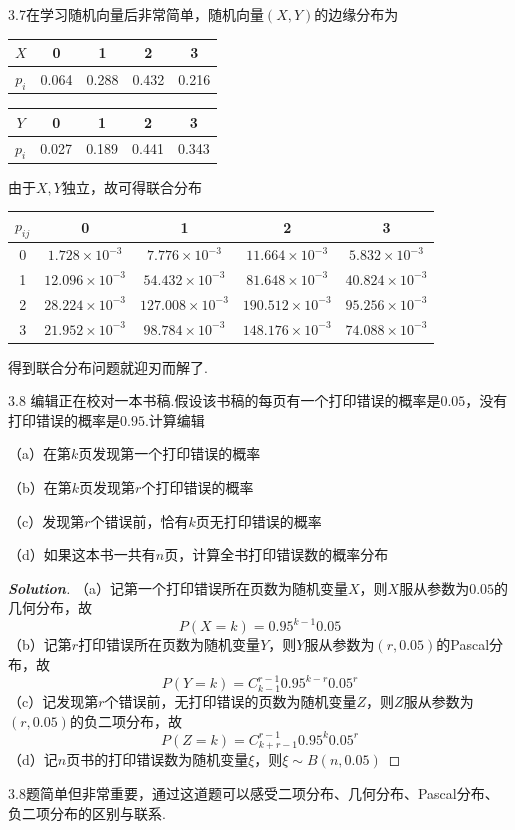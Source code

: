 \documentclass[10pt, a4paper, oneside]{ctexart}
\newenvironment{solution}{\begin{proof}[\bf Solution]}{\end{proof}}
\begin{document}
\begin{remark}
3.7在学习随机向量后非常简单，随机向量$(X,Y)$的边缘分布为
\begin{table}[H]
    \centering
    \begin{tabular}{|c|c|c|c|c|} \hline 
         $X$&  0&  1&  2& 3\\ \hline
 $p_i$& 0.064& 0.288& 0.432&0.216\\\hline
    \end{tabular}
\end{table}
\begin{table}[H]
    \centering
    \begin{tabular}{|c|c|c|c|c|} \hline 
         $Y$&  0&  1&  2& 3\\ \hline
 $p_i$& 0.027& 0.189& 0.441&0.343\\\hline
    \end{tabular}
\end{table}
由于$X,Y$独立，故可得联合分布
\begin{table}[H]
    \centering
    \begin{tabular}{|c|c|c|c|c|} \hline 
         $p_{ij}$&  0&  1&  2& 3\\ \hline 
         0&  $1.728\times 10^{-3}$&  $7.776\times 10^{-3}$&  $11.664\times 10^{-3}$& $5.832\times 10^{-3}$\\ \hline 
         1&  $12.096\times 10^{-3}$&  $54.432\times 10^{-3}$&  $81.648\times 10^{-3}$& $40.824\times 10^{-3}$\\ \hline 
         2&  $28.224\times 10^{-3}$&  $127.008\times 10^{-3}$&  $190.512\times 10^{-3}$& $95.256\times 10^{-3}$\\ \hline 
         3&  $21.952\times 10^{-3}$&  $98.784\times 10^{-3}$&  $148.176\times 10^{-3}$& $74.088\times 10^{-3}$\\ \hline
    \end{tabular}
\end{table}
得到联合分布问题就迎刃而解了.
\end{remark}

3.8 编辑正在校对一本书稿.假设该书稿的每页有一个打印错误的概率是$0.05$，没有打印错误的概率是$0.95$.计算编辑

（a）在第$k$页发现第一个打印错误的概率

（b）在第$k$页发现第$r$个打印错误的概率

（c）发现第$r$个错误前，恰有$k$页无打印错误的概率

（d）如果这本书一共有$n$页，计算全书打印错误数的概率分布
\begin{solution}
（a）记第一个打印错误所在页数为随机变量$X$，则$X$服从参数为$0.05$的几何分布，故
\[P(X=k)=0.95^{k-1} 0.05\]
（b）记第$r$打印错误所在页数为随机变量$Y$，则$Y$服从参数为$(r,0.05)$的Pascal分布，故
\[P(Y = k) = C_{k - 1}^{r - 1}{0.95^{k - r}}{0.05^r}\]
（c）记发现第$r$个错误前，无打印错误的页数为随机变量$Z$，则$Z$服从参数为$(r,0.05)$的负二项分布，故 
\[P(Z = k) = C_{k + r - 1}^{r - 1}{0.95^k}{0.05^r}\]
（d）记$n$页书的打印错误数为随机变量$\xi$，则$\xi\sim B(n,0.05)$
\end{solution}
\begin{remark}
3.8题简单但非常重要，通过这道题可以感受二项分布、几何分布、Pascal分布、负二项分布的区别与联系.
\end{remark}
\end{document}
